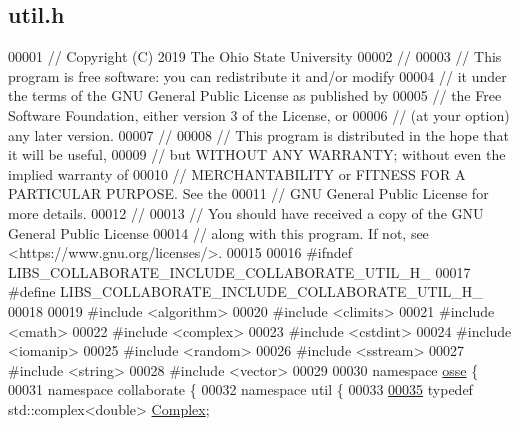 \hypertarget{util_8h_source}{}\subsection{util.\+h}
\label{util_8h_source}

\begin{DoxyCode}
00001 \textcolor{comment}{// Copyright (C) 2019 The Ohio State University}
00002 \textcolor{comment}{//}
00003 \textcolor{comment}{// This program is free software: you can redistribute it and/or modify}
00004 \textcolor{comment}{// it under the terms of the GNU General Public License as published by}
00005 \textcolor{comment}{// the Free Software Foundation, either version 3 of the License, or}
00006 \textcolor{comment}{// (at your option) any later version.}
00007 \textcolor{comment}{//}
00008 \textcolor{comment}{// This program is distributed in the hope that it will be useful,}
00009 \textcolor{comment}{// but WITHOUT ANY WARRANTY; without even the implied warranty of}
00010 \textcolor{comment}{// MERCHANTABILITY or FITNESS FOR A PARTICULAR PURPOSE.  See the}
00011 \textcolor{comment}{// GNU General Public License for more details.}
00012 \textcolor{comment}{//}
00013 \textcolor{comment}{// You should have received a copy of the GNU General Public License}
00014 \textcolor{comment}{// along with this program.  If not, see <https://www.gnu.org/licenses/>.}
00015 
00016 \textcolor{preprocessor}{#ifndef LIBS\_COLLABORATE\_INCLUDE\_COLLABORATE\_UTIL\_H\_}
00017 \textcolor{preprocessor}{#define LIBS\_COLLABORATE\_INCLUDE\_COLLABORATE\_UTIL\_H\_}
00018 
00019 \textcolor{preprocessor}{#include <algorithm>}
00020 \textcolor{preprocessor}{#include <climits>}
00021 \textcolor{preprocessor}{#include <cmath>}
00022 \textcolor{preprocessor}{#include <complex>}
00023 \textcolor{preprocessor}{#include <cstdint>}
00024 \textcolor{preprocessor}{#include <iomanip>}
00025 \textcolor{preprocessor}{#include <random>}
00026 \textcolor{preprocessor}{#include <sstream>}
00027 \textcolor{preprocessor}{#include <string>}
00028 \textcolor{preprocessor}{#include <vector>}
00029 
00030 \textcolor{keyword}{namespace }\hyperlink{namespaceosse}{osse} \{
00031 \textcolor{keyword}{namespace }collaborate \{
00032 \textcolor{keyword}{namespace }util \{
00033 
\hyperlink{util_8h_a8d1f6a2e0aa4520710c2d90b8a12b945}{00035} \textcolor{keyword}{typedef} std::complex<double> \hyperlink{util_8h_a8d1f6a2e0aa4520710c2d90b8a12b945}{Complex};

\end{DoxyCode}
